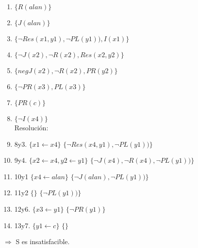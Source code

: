 \documentclass[10pt,a4paper]{article}
\begin{document}
\begin{enumerate}
\item $\{R(alan)\}$
\item $\{J(alan)\}$
\item $\{ \lnot Res(x1,y1), \lnot PL(y1)), I(x1) \}$
\item $\{\lnot J(x2), \lnot R(x2), Res(x2,y2)\}$
\item $\{neg J(x2), \lnot R(x2), PR(y2)\}$
\item $\{\lnot PR(x3), PL(x3)\}$
\item $\{PR(c)\}$
\item $\{\lnot I(x4)\}$ \\
Resolución:
\item 8y3. $\{x1 \leftarrow x4\}$ $\{\lnot Res(x4,y1), \lnot PL(y1))\}$
\item 9y4. $\{x2 \leftarrow x4, y2 \leftarrow y1\}$ $\{\lnot J(x4), \lnot R(x4), \lnot PL(y1))\}$
\item 10y1 $\{x4 \leftarrow alan\}$ $\{\lnot J(alan), \lnot PL(y1))\}$
\item 11y2 $\{\}$ $\{\lnot PL(y1))\}$
\item 12y6. $\{x3 \leftarrow y1\}$ $\{\lnot PR(y1)\}$
\item 13y7. $\{y1 \leftarrow c\}$ $\{\}$
\end{enumerate}
$\Rightarrow$ S es insatisfacible.
\end{document}
